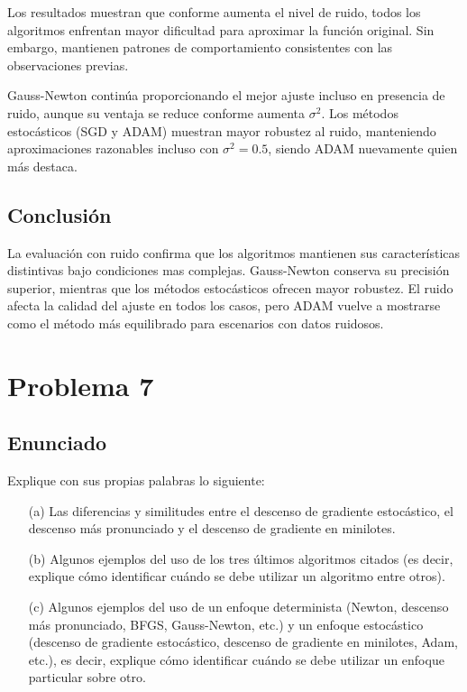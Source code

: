\documentclass{article}
\begin{document}
Los resultados muestran que conforme aumenta el nivel de ruido, todos los algoritmos enfrentan mayor dificultad para aproximar la función original. Sin embargo, mantienen patrones de comportamiento consistentes con las observaciones previas.

Gauss-Newton continúa proporcionando el mejor ajuste incluso en presencia de ruido, aunque su ventaja se reduce conforme aumenta $\sigma^2$. Los métodos estocásticos (SGD y ADAM) muestran mayor robustez al ruido, manteniendo aproximaciones razonables incluso con $\sigma^2 = 0.5$, siendo ADAM nuevamente quien más destaca.

\subsection{Conclusión}

La evaluación con ruido confirma que los algoritmos mantienen sus características distintivas bajo condiciones mas complejas. Gauss-Newton conserva su precisión superior, mientras que los métodos estocásticos ofrecen mayor robustez. El ruido afecta la calidad del ajuste en todos los casos, pero ADAM vuelve a mostrarse como el método más equilibrado para escenarios con datos ruidosos.

\section{Problema 7}

\subsection{Enunciado}

Explique con sus propias palabras lo siguiente:

\begin{itemize}
    \item[(a)] Las diferencias y similitudes entre el descenso de gradiente estocástico, el descenso más pronunciado y el descenso de gradiente en minilotes.
    \item[(b)] Algunos ejemplos del uso de los tres últimos algoritmos citados (es decir, explique cómo identificar cuándo se debe utilizar un algoritmo entre otros).
    \item[(c)] Algunos ejemplos del uso de un enfoque determinista (Newton, descenso más pronunciado, BFGS, Gauss-Newton, etc.) y un enfoque estocástico (descenso de gradiente estocástico, descenso de gradiente en minilotes, Adam, etc.), es decir, explique cómo identificar cuándo se debe utilizar un enfoque particular sobre otro.

\end{itemize}
\end{document}
